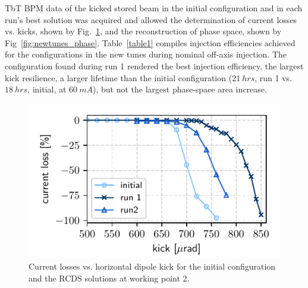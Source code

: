 \documentclass[a4paper,
               keeplastbox,   %
               ]{jacow}
\begin{document}
TbT BPM data of the kicked stored beam  in the initial configuration and in each run's best solution was acquired and allowed the determination of current losses vs. kicks, shown by Fig.~\ref{fig:loss_kicks_newtunes}, and the reconstruction of phase space, shown by Fig~\ref{fig:newtunes_phase}. Table~\ref{table1} compiles injection efficiencies achieved for the configurations in the new tunes during nominal off-axis injection. The configuration found during run 1 rendered the best injection efficiency, the largest kick resilience, a larger lifetime than the initial configuration ($21~\unit{hrs}$, run 1 vs. $18~\unit{hrs}$, initial, at $60~\unit{mA}$), but not the largest phase-space area increase.
\begin{figure}[!h]
   \includegraphics[width=\columnwidth]{new_tunes_kick_resilience.pdf}
   \caption{Current losses vs. horizontal dipole kick for the initial configuration and the RCDS solutions at working point 2.}
   \label{fig:loss_kicks_newtunes}
\end{figure}
\end{document}

